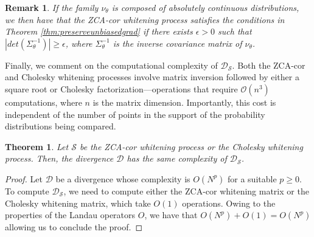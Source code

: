 \documentclass{article}
\renewcommand{\ge}{\geqslant}
\def\DDSS{\mathcal{D}_\mathcal{S}}
\newtheorem{theorem}{Theorem}
\newtheorem{remark}{Remark}
\newtheorem{proof}{Proof}
\begin{document}
% 
\begin{remark}
    If the family $\nu_\theta$ is composed of absolutely continuous distributions, we then have that the ZCA-cor whitening process satisfies the conditions in Theorem \ref{thm:preserveunbiasedgrad} if there exists $\epsilon>0$ such that $|det(\Sigma_\theta^{-1})|\ge \epsilon$, where $\Sigma_\theta^{-1}$ is the inverse covariance matrix of $\nu_\theta$. 
\end{remark}

% 
Finally, we comment on the computational complexity of $\DDSS$.
%
Both the ZCA-cor and Cholesky whitening processes involve matrix inversion followed by either a square root or Cholesky factorization—operations that require $\mathcal{O}(n^3)$ computations, where $n$ is the matrix dimension.
%
Importantly, this cost is independent of the number of points in the support of the probability distributions being compared.
% 
% 
% 

\begin{theorem}
    Let $\mathcal{S}$ be the ZCA-cor whitening process or the Cholesky whitening process.
    Then, the divergence $\mathcal{D}$ has the same complexity of $\DDSS$. 
\end{theorem}


\begin{proof}
    Let $\mathcal{D}$ be a divergence whose complexity is $O(N^p)$ for a suitable $p\ge 0$.
    To compute $\DDSS$, we need to compute either the ZCA-cor whitening matrix or the Cholesky whitening matrix, which take $O(1)$ operations.
    Owing to the properties of the Landau operators $O$, we have that $O(N^p)+O(1)=O(N^p)$ allowing us to conclude the proof.
\end{proof}
\end{document}
